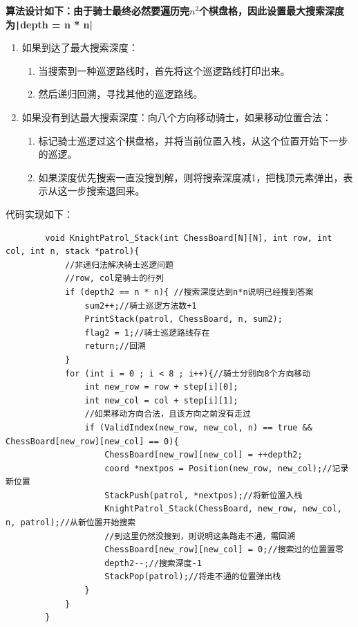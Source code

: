 \documentclass[10pt,a4paper]{article}
\begin{document}
	\noindent \textbf{算法设计如下：由于骑士最终必然要遍历完$n^2$个棋盘格，因此设置最大搜索深度为\texttt|depth = n * n|}
	\begin{enumerate}
		\item 如果到达了最大搜索深度：
		\begin{enumerate}
			\item 当搜索到一种巡逻路线时，首先将这个巡逻路线打印出来。
			\item 然后递归回溯，寻找其他的巡逻路线。
		\end{enumerate}
		\item 如果没有到达最大搜索深度：向八个方向移动骑士，如果移动位置合法：
		\begin{enumerate}
			\item 标记骑士巡逻过这个棋盘格，并将当前位置入栈，从这个位置开始下一步的巡逻。
			\item 如果深度优先搜索一直没搜到解，则将搜索深度减1，把栈顶元素弹出，表示从这一步搜索退回来。
		\end{enumerate}
	\end{enumerate}
	代码实现如下：
	\begin{verbatim}
		void KnightPatrol_Stack(int ChessBoard[N][N], int row, int col, int n, stack *patrol){
			//非递归法解决骑士巡逻问题
			//row, col是骑士的行列
			if (depth2 == n * n){ //搜索深度达到n*n说明已经搜到答案
				sum2++;//骑士巡逻方法数+1
				PrintStack(patrol, ChessBoard, n, sum2);
				flag2 = 1;//骑士巡逻路线存在
				return;//回溯
			}
			for (int i = 0 ; i < 8 ; i++){//骑士分别向8个方向移动
				int new_row = row + step[i][0];
				int new_col = col + step[i][1];
				//如果移动方向合法，且该方向之前没有走过
				if (ValidIndex(new_row, new_col, n) == true && ChessBoard[new_row][new_col] == 0){
					ChessBoard[new_row][new_col] = ++depth2;
					coord *nextpos = Position(new_row, new_col);//记录新位置
					StackPush(patrol, *nextpos);//将新位置入栈
					KnightPatrol_Stack(ChessBoard, new_row, new_col, n, patrol);//从新位置开始搜索
					//到这里仍然没搜到，则说明这条路走不通，需回溯
					ChessBoard[new_row][new_col] = 0;//搜索过的位置置零
					depth2--;//搜索深度-1
					StackPop(patrol);//将走不通的位置弹出栈
				}
			}
		}
	\end{verbatim}
	\newpage
\end{document}

